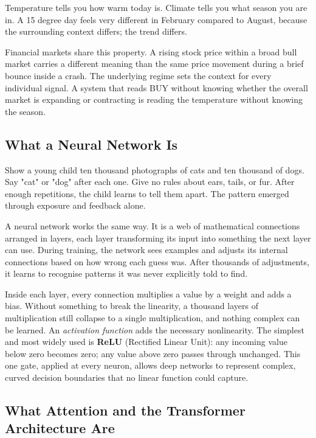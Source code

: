 \documentclass[journal]{IEEEtran}
\begin{document}
Temperature tells you how warm today is. Climate tells you what season
you are in. A 15 degree day feels very different in February compared to
August, because the surrounding context differs; the trend differs.

Financial markets share this property. A rising stock price within a
broad bull market carries a different meaning than the same price movement
during a brief bounce inside a crash. The underlying regime sets the
context for every individual signal. A system that reads BUY without
knowing whether the overall market is expanding or contracting is reading
the temperature without knowing the season.

\subsection{What a Neural Network Is}

Show a young child ten thousand photographs of cats and ten thousand of
dogs. Say "cat" or "dog" after each one. Give no rules about ears, tails,
or fur. After enough repetitions, the child learns to tell them apart.
The pattern emerged through exposure and feedback alone.

A neural network works the same way. It is a web of mathematical
connections arranged in layers, each layer transforming its input into
something the next layer can use. During training, the network sees
examples and adjusts its internal connections based on how wrong each
guess was. After thousands of adjustments, it learns to recognise patterns
it was never explicitly told to find.

Inside each layer, every connection multiplies a value by a weight and
adds a bias. Without something to break the linearity, a thousand layers
of multiplication still collapse to a single multiplication, and nothing
complex can be learned. An \textit{activation function} adds the
necessary nonlinearity. The simplest and most widely used is \textbf{ReLU}
(Rectified Linear Unit): any incoming value below zero becomes zero; any
value above zero passes through unchanged. This one gate, applied at
every neuron, allows deep networks to represent complex, curved decision
boundaries that no linear function could capture.

\subsection{What Attention and the Transformer Architecture Are}
\end{document}
